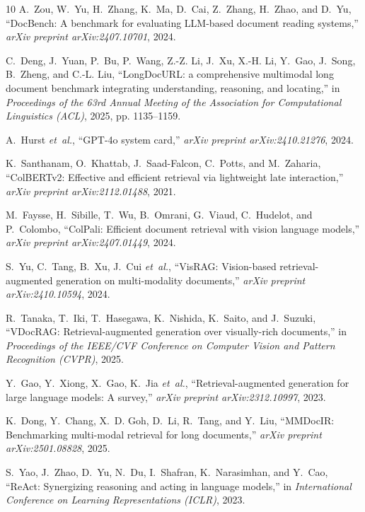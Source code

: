 \documentclass[pdflatex,sn-basic]{sn-jnl}%
\theoremstyle{thmstyletwo}%
\begin{document}
\begin{thebibliography}{10}
A.~Zou, W.~Yu, H.~Zhang, K.~Ma, D.~Cai, Z.~Zhang, H.~Zhao, and D.~Yu,
  ``{DocBench}: A benchmark for evaluating {LLM}-based document reading
  systems,'' \emph{arXiv preprint arXiv:2407.10701}, 2024.

C.~Deng, J.~Yuan, P.~Bu, P.~Wang, Z.-Z. Li, J.~Xu, X.-H. Li, Y.~Gao, J.~Song,
  B.~Zheng, and C.-L. Liu, ``{LongDocURL}: a comprehensive multimodal long
  document benchmark integrating understanding, reasoning, and locating,'' in
  \emph{Proceedings of the 63rd Annual Meeting of the Association for
  Computational Linguistics (ACL)}, 2025, pp. 1135--1159.

A.~Hurst \emph{et~al.}, ``{GPT-4o} system card,'' \emph{arXiv preprint
  arXiv:2410.21276}, 2024.

K.~Santhanam, O.~Khattab, J.~Saad-Falcon, C.~Potts, and M.~Zaharia,
  ``{ColBERTv2}: Effective and efficient retrieval via lightweight late
  interaction,'' \emph{arXiv preprint arXiv:2112.01488}, 2021.

M.~Faysse, H.~Sibille, T.~Wu, B.~Omrani, G.~Viaud, C.~Hudelot, and P.~Colombo,
  ``{ColPali}: Efficient document retrieval with vision language models,''
  \emph{arXiv preprint arXiv:2407.01449}, 2024.

S.~Yu, C.~Tang, B.~Xu, J.~Cui \emph{et~al.}, ``{VisRAG}: Vision-based
  retrieval-augmented generation on multi-modality documents,'' \emph{arXiv
  preprint arXiv:2410.10594}, 2024.

R.~Tanaka, T.~Iki, T.~Hasegawa, K.~Nishida, K.~Saito, and J.~Suzuki,
  ``{VDocRAG}: Retrieval-augmented generation over visually-rich documents,''
  in \emph{Proceedings of the IEEE/CVF Conference on Computer Vision and
  Pattern Recognition (CVPR)}, 2025.

Y.~Gao, Y.~Xiong, X.~Gao, K.~Jia \emph{et~al.}, ``Retrieval-augmented
  generation for large language models: A survey,'' \emph{arXiv preprint
  arXiv:2312.10997}, 2023.

K.~Dong, Y.~Chang, X.~D. Goh, D.~Li, R.~Tang, and Y.~Liu, ``{MMDocIR}:
  Benchmarking multi-modal retrieval for long documents,'' \emph{arXiv preprint
  arXiv:2501.08828}, 2025.

S.~Yao, J.~Zhao, D.~Yu, N.~Du, I.~Shafran, K.~Narasimhan, and Y.~Cao,
  ``{ReAct}: Synergizing reasoning and acting in language models,'' in
  \emph{International Conference on Learning Representations (ICLR)}, 2023.


\end{thebibliography}
\end{document}
